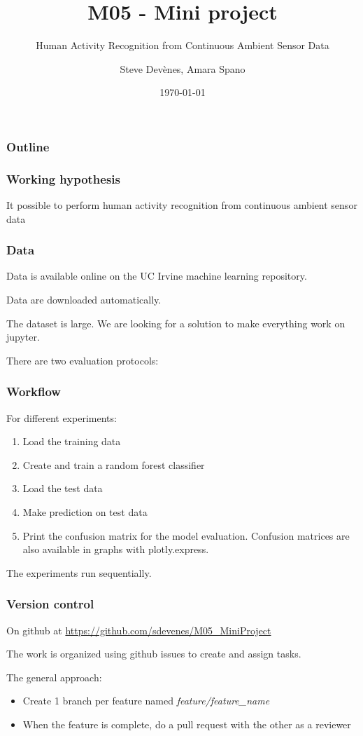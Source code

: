 \documentclass{beamer}
\title{M05 - Mini project}
\subtitle{Human Activity Recognition from Continuous Ambient Sensor Data}
\author{Steve Devènes, Amara Spano}
\institute{Unidistance}
\date{\today}
\begin{document}
	\begin{frame}
		\titlepage
	\end{frame}

	\begin{frame}
		\frametitle{Outline}
		\tableofcontents
	\end{frame}


	\begin{frame}
		\frametitle{Working hypothesis}
		It possible to perform human activity recognition from continuous ambient sensor data
	\end{frame}

	\begin{frame}
		\frametitle{Data}
		Data is available online on the UC Irvine machine learning repository.

		Data are downloaded automatically.

		The dataset is large. We are looking for a solution to make everything work on jupyter.

		There are two evaluation protocols:
		\begin{figure}
			\centering
		\end{figure}
	\end{frame}

	\begin{frame}
		\frametitle{Workflow}
		For different experiments:
		\begin{enumerate}
			\item Load the training data
			\item Create and train a random forest classifier
			\item Load the test data
			\item Make prediction on test data
			\item Print the confusion matrix for the model evaluation. Confusion matrices are also available in graphs with plotly.express.
		\end{enumerate}

		The experiments run sequentially.
	\end{frame}

	\begin{frame}
		\frametitle{Version control}
		On github at \url{https://github.com/sdevenes/M05_MiniProject}

		The work is organized using github issues to create and assign tasks.

		The general approach:
		\begin{itemize}
			\item Create 1 branch per feature named \textit{feature/feature\_name}
			\item When the feature is complete, do a pull request with the other as a reviewer
		\end{itemize}
	\end{frame}
\end{document}
